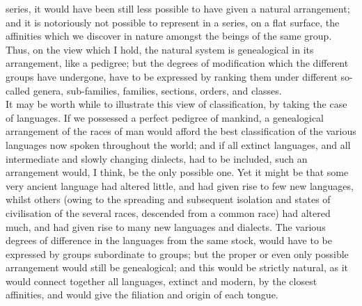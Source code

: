 series, it would have been still less possible to have given a natural arrangement; and it is notoriously not possible to represent in a series, on a flat surface, the affinities which we discover in nature amongst the beings of the same group. Thus, on the view which I hold, the natural system is genealogical in its arrangement, like a pedigree; but the degrees of modification which the different groups have undergone, have to be expressed by ranking them under different so-called genera, sub-families, families, sections, orders, and classes.~\\
\indent It may be worth while to illustrate this view of classification, by taking the case of languages. If we possessed a perfect pedigree of mankind, a genealogical arrangement of the races of man would afford the best classification of the various languages now spoken throughout the world; and if all extinct languages, and all intermediate and slowly changing dialects, had to be included, such an arrangement would, I think, be the only possible one. Yet it might be that some very ancient language had altered little, and had given rise to few new languages, whilst others (owing to the spreading and subsequent isolation and states of civilisation of the several races, descended from a common race) had altered much, and had given rise to many new languages and dialects. The various degrees of difference in the languages from the same stock, would have to be expressed by groups subordinate to groups; but the proper or even only possible arrangement would still be genealogical; and this would be strictly natural, as it would connect together all languages, extinct and modern, by the closest affinities, and would give the filiation and origin of each tongue.~\\

